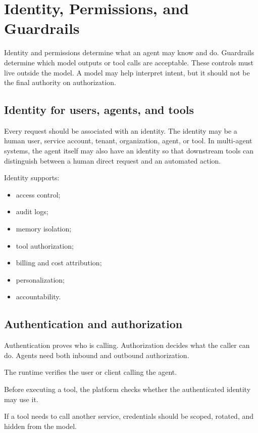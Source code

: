 \chapter{Identity, Permissions, and Guardrails}

Identity and permissions determine what an agent may know and do. Guardrails determine which model outputs or tool calls are acceptable. These controls must live outside the model. A model may help interpret intent, but it should not be the final authority on authorization.

\section{Identity for users, agents, and tools}

Every request should be associated with an identity. The identity may be a human user, service account, tenant, organization, agent, or tool. In multi-agent systems, the agent itself may also have an identity so that downstream tools can distinguish between a human direct request and an automated action.

Identity supports:

\begin{itemize}[leftmargin=*]
  \item access control;
  \item audit logs;
  \item memory isolation;
  \item tool authorization;
  \item billing and cost attribution;
  \item personalization;
  \item accountability.
\end{itemize}

\section{Authentication and authorization}

Authentication proves who is calling. Authorization decides what the caller can do. Agents need both inbound and outbound authorization.

\begin{description}[leftmargin=*]
  \item[Inbound authentication.] The runtime verifies the user or client calling the agent.
  \item[Tool authorization.] Before executing a tool, the platform checks whether the authenticated identity may use it.
  \item[Outbound credentials.] If a tool needs to call another service, credentials should be scoped, rotated, and hidden from the model.
\end{description}

